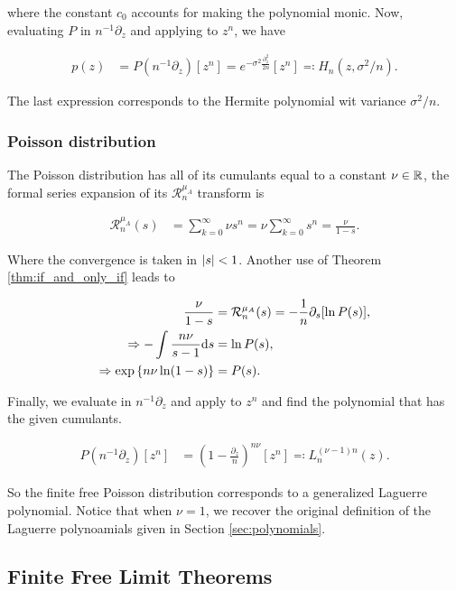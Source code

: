 \noindent where the constant $c_0$ accounts for making the polynomial monic. Now, evaluating $P$ in $n^{-1}\partial_z$ and applying to $z^n$, we have

\begin{align*}
    p(z) &= P(n^{-1}\partial_z)[z^n] = e^{-\sigma^2\frac{\partial_z^2}{2n}}[z^n] \eqcolon H_n(z,\sigma^2/n). 
\end{align*}

The last expression corresponds to the Hermite polynomial wit variance $\sigma^2/n$.

\subsubsection{Poisson distribution}

The Poisson distribution has all of its cumulants equal to a constant $\nu \in \mathbb R$, the formal series expansion of its $\mathcal R_n^{\mu_A}$ transform is 

\begin{align*}
    \mathcal R_n^{\mu_A}(s) &= \sum_{k=0}^\infty \nu s^n = \nu \sum_{k=0}^\infty s^n = \frac{\nu}{1-s}.
\end{align*}

Where the convergence is taken in $\lvert s \rvert < 1$. Another use of Theorem \ref{thm:if_and_only_if} leads to

\begin{align*}
    \frac{\nu}{1-s} &= \mathcal R_n^{\mu_A}(s) = -\frac1n\partial_s[\ln P(s)], \\
    \Rightarrow -\int \frac{n\nu}{s-1} \mathrm d s &= \ln P(s),\\
    \Rightarrow \exp\left\{ n\nu \ln (1-s) \right\} &= P(s).
\end{align*}

Finally, we evaluate in $n^{-1}\partial_z$ and apply to $z^n$ and find the polynomial that has the given cumulants.

\begin{align} \label{eq:ff_poisson}
    P(n^{-1}\partial_z)[z^n] &= \left( 1 - \frac{\partial_z}{n} \right)^{n\nu}[z^n] \eqcolon L_n^{(\nu-1)n}(z).
\end{align}

So the finite free Poisson distribution corresponds to a generalized Laguerre polynomial. Notice that when $\nu=1$, we recover the original definition of the Laguerre polynoamials given in Section \ref{sec:polynomials}.

\subsection{Finite Free Limit Theorems}

